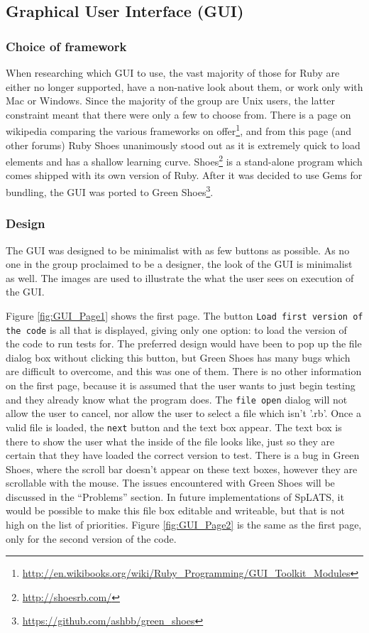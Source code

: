   \subsection{Graphical User Interface (GUI)}
  \subsubsection{Choice of framework}
  When researching which GUI to use, the vast majority of those for Ruby are either no longer supported, have a non-native look about them, or work only with Mac or Windows. Since the majority of the group are Unix users, the latter constraint meant that there were only a few to choose from. There is a page on wikipedia comparing the various frameworks on offer\footnote{\url{http://en.wikibooks.org/wiki/Ruby_Programming/GUI_Toolkit_Modules}}, and from this page (and other forums) Ruby Shoes unanimously stood out as it is extremely quick to load elements and has a shallow learning curve.
  Shoes\footnote{\url{http://shoesrb.com/}} is a stand-alone program which comes shipped with its own version of Ruby. After it was decided to use Gems for bundling, the GUI was ported to Green Shoes\footnote{\url{https://github.com/ashbb/green_shoes}}.
  
  \subsubsection{Design}
  The GUI was designed to be minimalist with as few buttons as possible. As no one in the group proclaimed to be a designer, the look of the GUI is minimalist as well. The images are used to illustrate the what the user sees on execution of the GUI.
  
  Figure \ref{fig:GUI_Page1} shows the first page. The button \verb+Load first version of the code+ is all that is displayed, giving only one option: to load the version of the code to run tests for. The preferred design would have been to pop up the file dialog box without clicking this button, but Green Shoes has many bugs which are difficult to overcome, and this was one of them. There is no other information on the first page, because it is assumed that the user wants to just begin testing and they already know what the program does. The \verb+file open+ dialog will not allow the user to cancel, nor allow the user to select a file which isn't '.rb'. Once a valid file is loaded, the \verb+next+ button and the text box appear. The text box is there to show the user what the inside of the file looks like, just so they are certain that they have loaded the correct version to test. There is a bug in Green Shoes, where the scroll bar doesn't appear on these text boxes, however they are scrollable with the mouse. The issues encountered with Green Shoes will be discussed in the ``Problems'' section. In future implementations of SpLATS, it would be possible to make this file box editable and writeable, but that is not high on the list of priorities.
Figure \ref{fig:GUI_Page2} is the same as the first page, only for the second version of the code.
  
